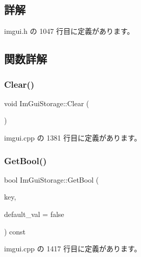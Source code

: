 \subsection{詳解}


 imgui.\+h の 1047 行目に定義があります。



\subsection{関数詳解}
\mbox{\label{struct_im_gui_storage_a72ceecfbca3d08df8c2a232b77890c20}} 
\subsubsection{\texorpdfstring{Clear()}{Clear()}}
{\footnotesize\ttfamily void Im\+Gui\+Storage\+::\+Clear (\begin{DoxyParamCaption}{ }\end{DoxyParamCaption})}



 imgui.\+cpp の 1381 行目に定義があります。

\mbox{\label{struct_im_gui_storage_a22d34ae6278f86468a3e7df8fbd1b632}} 
\subsubsection{\texorpdfstring{Get\+Bool()}{GetBool()}}
{\footnotesize\ttfamily bool Im\+Gui\+Storage\+::\+Get\+Bool (\begin{DoxyParamCaption}\item[{\mbox{\hyperlink{imgui_8h_a1785c9b6f4e16406764a85f32582236f}{Im\+Gui\+ID}}}]{key,  }\item[{bool}]{default\+\_\+val = {\ttfamily false} }\end{DoxyParamCaption}) const}



 imgui.\+cpp の 1417 行目に定義があります。

